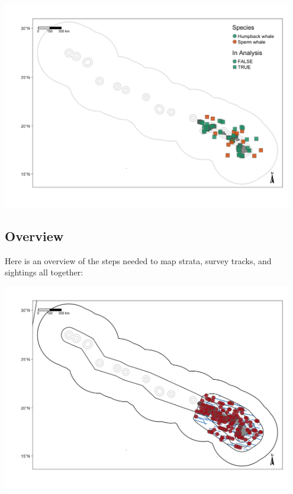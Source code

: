 \documentclass[
]{book}
\newenvironment{Shaded}{\begin{snugshade}}{\end{snugshade}}
\newcommand{\DataTypeTok}[1]{\textcolor[rgb]{0.13,0.29,0.53}{#1}}
\newcommand{\DecValTok}[1]{\textcolor[rgb]{0.00,0.00,0.81}{#1}}
\newcommand{\KeywordTok}[1]{\textcolor[rgb]{0.13,0.29,0.53}{\textbf{#1}}}
\newcommand{\NormalTok}[1]{#1}
\newcommand{\OperatorTok}[1]{\textcolor[rgb]{0.81,0.36,0.00}{\textbf{#1}}}
\newcommand{\StringTok}[1]{\textcolor[rgb]{0.31,0.60,0.02}{#1}}
\begin{document}
\includegraphics[width=0.95\textwidth,height=\textheight]{img/map_sits3.png}

\hypertarget{overview-1}{%
\subsection*{Overview}\label{overview-1}}

Here is an overview of the steps needed to map strata, survey tracks, and sightings all together:

\begin{Shaded}
\end{Shaded}

\includegraphics[width=0.95\textwidth,height=\textheight]{img/map_overview.png}
\end{document}
